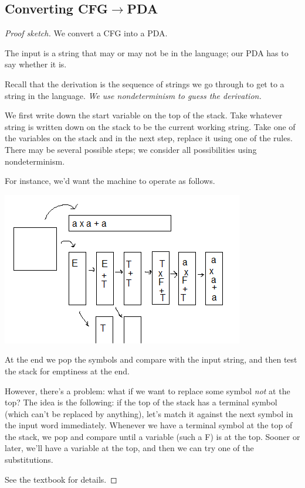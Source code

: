 \subsection{Converting CFG$\to$PDA}
\begin{proof}[Proof sketch]
We convert a CFG into a PDA. %

The input is a string that may or may not be in the language; our PDA has to say whether it is.

Recall that the derivation is the sequence of strings we go through to get to a string in the language. {\it We use nondeterminism to guess the derivation.}

We first write down the start variable on the top of the stack. Take whatever string is written down on the stack to be the current working string. Take one of the variables on the stack and in the next step, replace it using one of the rules. There may be several possible steps; we consider all possibilities using nondeterminism.


For instance, we'd want the machine to operate as follows.

\begin{center}
\includegraphics{5-1}
\end{center}

At the end we pop the symbols and compare with the input string, and then test the stack for emptiness at the end.

However, there's a problem: what if we want to replace some symbol {\it not} at the top?
The idea is the following: if the top of the stack has a terminal symbol (which can't be replaced by anything), let's match it against the next symbol in the input word immediately. %
Whenever we have a terminal symbol at the top of the stack, we pop and compare until a variable (such a F) is at the top. Sooner or later, we'll have a variable at the top, and then we can try one of the substitutions. 

See the textbook for details.
\end{proof}
